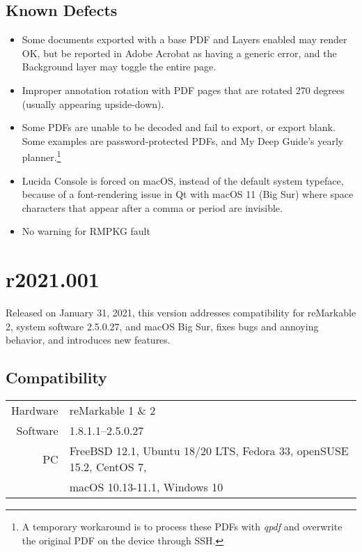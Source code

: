 \subsection{Known Defects}
\begin{itemize}
\item{Some documents exported with a base PDF and Layers enabled may render OK, but be reported in Adobe Acrobat as having a generic error, and the Background layer may toggle the entire page.}
\item{Improper annotation rotation with PDF pages that are rotated 270 degrees (usually appearing upside-down).}
\item{Some PDFs are unable to be decoded and fail to export, or export blank. Some examples are password-protected PDFs, and My Deep Guide's yearly planner.\footnote{A temporary workaround is to process these PDFs with \textit{qpdf} and overwrite the original PDF on the device through SSH.}}
  \item{Lucida Console is forced on macOS, instead of the default system typeface, because of a font-rendering issue in Qt with macOS 11 (Big Sur) where space characters that appear after a comma or period are invisible.}
  \item{No warning for RMPKG fault}
\end{itemize}






\newpage
\section{r2021.001}
\label{sec:r2021.001}
Released on January 31, 2021, this version addresses compatibility for reMarkable 2, system software 2.5.0.27, and macOS Big Sur, fixes bugs and annoying behavior, and introduces new features.

\subsection{Compatibility}
\begin{tabular}{ r | l }
  Hardware & reMarkable 1 \& 2 \\
  Software & 1.8.1.1--2.5.0.27 \\
  PC & FreeBSD 12.1, Ubuntu 18/20 LTS, Fedora 33, openSUSE 15.2, CentOS 7, \\
  & macOS 10.13-11.1, Windows 10 \\
\end{tabular}

